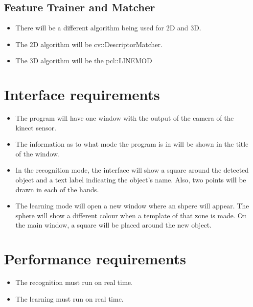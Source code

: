 \documentclass{article}
\begin{document}
\subsection{Feature Trainer and Matcher}
\begin{itemize}
\item There will be a different algorithm being used for 2D and 3D. 
\item The 2D algorithm will be cv::DescriptorMatcher.
\item The 3D algorithm will be the pcl::LINEMOD 

\end{itemize}

\section{Interface requirements}

\begin{itemize}
\item The program will have one window with the output of the camera of the kinect sensor. 
\item The information as to what mode the program is in will be shown in the title of the window.
\item In the recognition mode, the interface will show a square around the detected object and a text label indicating the object's name. Also, two points will be drawn in each of the hands. 
\item The learning mode will open a new window where an shpere will appear. The sphere will show a different colour when a template of that zone is made. On the main window, a square will be placed around the new object. 

\end{itemize}





\section{Performance requirements}

\begin{itemize}
\item The recognition must run on real time.
\item The learning must run on real time. 
\end{itemize}
\end{document}
